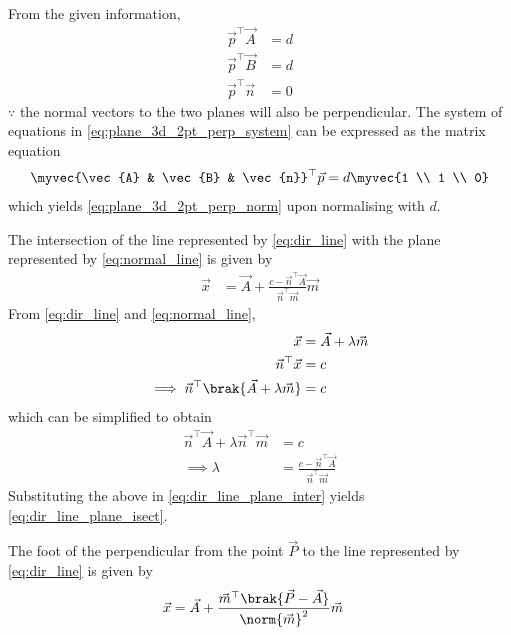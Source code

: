	\solution From the given information, 
		\begin{align}
			\vec{p}^{\top}\vec{A} &=d 
			\\
			\vec{p}^{\top}\vec{B} &=d 
			\\
			\vec{p}^{\top}\vec{n} &= 0
			\label{eq:plane_3d_2pt_perp_system}
		\end{align}
		$\because$ the normal vectors to the two planes will also be perpendicular.  The system of equations in 
			\eqref{eq:plane_3d_2pt_perp_system}
			can be expressed as the matrix equation
		\begin{align}
			\myvec{\vec{A} & \vec{B} & \vec{n}}^{\top}\vec{p} = d\myvec{1 \\ 1 \\ 0}
			\label{eq:plane_3d_2pt_perp_system_temp}
		\end{align}
		which yields 
			\eqref{eq:plane_3d_2pt_perp_norm}
			upon normalising with $d$.
		\item The intersection of the line represented by 
	\eqref{eq:dir_line}
	with the plane represented by 
	\eqref{eq:normal_line}
	is given by 
\begin{align}
	\label{eq:dir_line_plane_isect}
	\vec{x} &= \vec{A} + \frac{c - \vec{n}^{\top}\vec{A}}{\vec{n}^{\top}\vec{m}}
\vec{m}
\end{align}
\solution From 
	\eqref{eq:dir_line}
	and 
	\eqref{eq:normal_line},
\begin{align}
	\vec{x} &= \vec{A} + \lambda \vec{m}
	\\
	\vec{n}^{\top}\vec{x} &= c
	\\
	\implies 
	\vec{n}^{\top}\brak{\vec{A} + \lambda \vec{m}}&= c
	\label{eq:dir_line_plane_inter}
\end{align}
which can be simplified to obtain
\begin{align}
	\vec{n}^{\top}\vec{A} + \lambda 	\vec{n}^{\top}\vec{m}&= c
	\\
	\implies \lambda &= \frac{c - \vec{n}^{\top}\vec{A}}{\vec{n}^{\top}\vec{m}}
\end{align}
Substituting the above in 
	\eqref{eq:dir_line_plane_inter}
	yields
	\eqref{eq:dir_line_plane_isect}.
\item The foot of the perpendicular from the point $\vec{P}$ to the line  represented by 
	\eqref{eq:dir_line}
	is given by 
\begin{align}
	\label{eq:plane_line_foot_ans}
	\vec{x} &= \vec{A} + \frac{ \vec{m}^{\top}\brak{\vec{P} - \vec{A}}}{\norm{\vec{m}}^2}
\vec{m}
\end{align}
